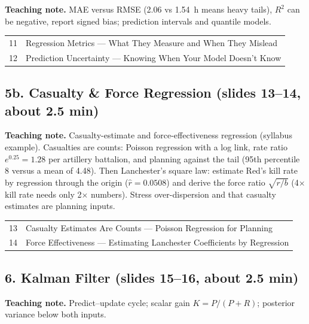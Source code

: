 \documentclass[11pt]{article}
\begin{document}
\textbf{Teaching note.} MAE versus RMSE (2.06 vs 1.54~h means heavy tails), $R^2$ can be negative, report signed bias; prediction intervals and quantile models.

\begin{center}\small\renewcommand{\arraystretch}{1.1}\begin{tabularx}{\textwidth}{@{}r X@{}}11 & Regression Metrics --- What They Measure and When They Mislead\\
12 & Prediction Uncertainty --- Knowing When Your Model Doesn't Know\\\end{tabularx}\end{center}

\subsection{5b. Casualty \& Force Regression \normalfont\small\color{GreyN}(slides 13--14, about 2.5 min)}

\textbf{Teaching note.} Casualty-estimate and force-effectiveness regression (syllabus example). Casualties are counts: Poisson regression with a log link, rate ratio $e^{0.25}=1.28$ per artillery battalion, and planning against the tail (95th percentile 8 versus a mean of 4.48). Then Lanchester's square law: estimate Red's kill rate by regression through the origin ($\hat r=0.0508$) and derive the force ratio $\sqrt{r/b}$ (4$\times$ kill rate needs only 2$\times$ numbers). Stress over-dispersion and that casualty estimates are planning inputs.

\begin{center}\small\renewcommand{\arraystretch}{1.1}\begin{tabularx}{\textwidth}{@{}r X@{}}13 & Casualty Estimates Are Counts --- Poisson Regression for Planning\\
14 & Force Effectiveness --- Estimating Lanchester Coefficients by Regression\\\end{tabularx}\end{center}

\subsection{6. Kalman Filter \normalfont\small\color{GreyN}(slides 15--16, about 2.5 min)}

\textbf{Teaching note.} Predict--update cycle; scalar gain $K=P/(P+R)$; posterior variance below both inputs.
\end{document}
